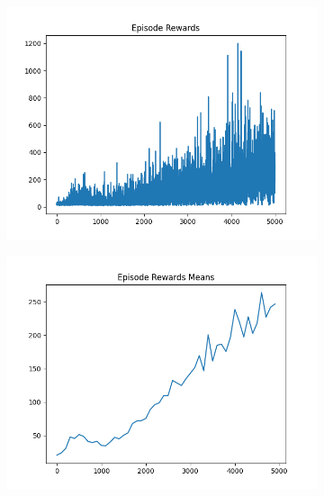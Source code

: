 \begin{figure}[H]
    \centering
    \begin{subfigure}{.47\linewidth}
        \centering
        \includegraphics[width=\textwidth]{pole/2024-06-13_21-45-52_dqn_cartpole_episode_rewards.png}
    \end{subfigure}
    \begin{subfigure}{.47\linewidth}
        \centering
        \includegraphics[width=\textwidth]{pole/2024-06-13_21-45-52_dqn_cartpole_episode_rewards_means.png}
    \end{subfigure}
    \begin{subfigure}{.47\linewidth}
        \centering

\end{subfigure}
\end{figure}
